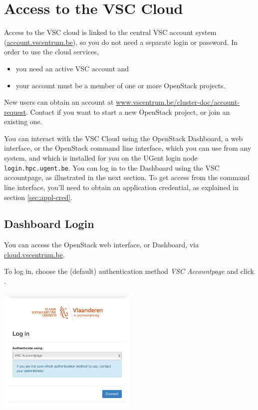\chapter{Access to the VSC Cloud}
Access to the VSC cloud is linked to the central VSC account system (\href{https://account.vscentrum.be}{account.vscentrum.be}), so you do not need a separate login or password.  In order to use the cloud services,
\begin{itemize}
\item you need an active VSC account and
\item your account must be a member of one or more OpenStack projects.
\end{itemize}
New users can obtain an account at
\href{https://www.vscentrum.be/cluster-doc/account-request}{www.vscentrum.be/cluster-doc/account-request}.  Contact
\cloudinfo if you want to start a new OpenStack project, or join an
existing one.

You can interact with the VSC Cloud using the OpenStack Dashboard, a web interface, or the OpenStack command line interface, which you can use from any system, and which is installed for you on the UGent login node \lstinline{login.hpc.ugent.be}.  You can log in to the Dashboard using the VSC accountpage, as illustrated in the next section.  To get access from the command line interface, you'll need to obtain an application credential, as explained in section \ref{sec:appl-cred}.

\section{Dashboard Login}\label{sec:dashboard-login}
You can access the OpenStack web interface, or Dashboard, via \href{https://cloud.vscentrum.be}{cloud.vscentrum.be}.

To log in, choose the (default) authentication method \emph{VSC Accountpage} and click .
\begin{center}
\includegraphics[width=0.5\textwidth]{img/cloud_login_1.png}
\end{center}

